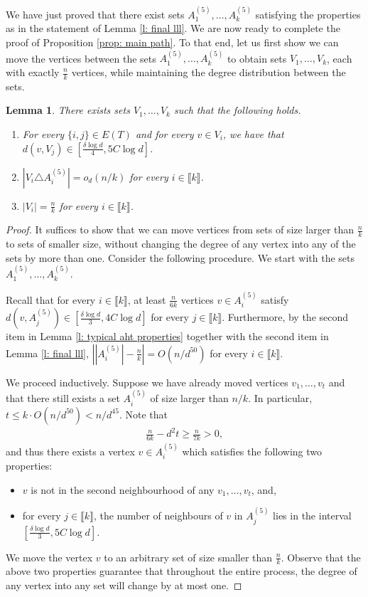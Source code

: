 \documentclass[notitlepage]{scrartcl}
\newcommand{\br}[1]{\llbracket{#1}\rrbracket}
\newtheorem{lemma}[thm]{Lemma}
\begin{document}
We have just proved that there exist sets $A_1^{(5)},\ldots, A_k^{(5)}$ satisfying the properties as in the statement of Lemma \ref{l: final lll}. We are now ready to complete the proof of Proposition \ref{prop: main path}. To that end, let us first show we can move the vertices between the sets $A_1^{(5)},\ldots, A_k^{(5)}$ to obtain sets $V_1,\ldots,V_k$, each with exactly $\frac{n}{k}$ vertices, while maintaining the degree distribution between the sets.
\begin{lemma}\label{l: final round}
There exists sets $V_1,\ldots,V_k$ such that the following holds.
\begin{enumerate}
    \item For every $\{i,j\}\in E(T)$ and for every $v\in V_i$, we have that $d(v,V_j)\in \left[\frac{\delta\log d}{4},5C\log d\right]$.
    \item $\left|V_i\triangle A_i^{(5)}\right|=o_d(n/k)$ for every $i\in \br{k}$.\label{l: final item distance}
    \item $|V_i|=\frac{n}{k}$ for every $i\in \br{k}$.
\end{enumerate}
\end{lemma}
\begin{proof}
It suffices to show that we can move vertices from sets of size larger than $\frac{n}{k}$ to sets of smaller size, without changing the degree of any vertex into any of the sets by more than one. Consider the following procedure. We start with the sets $A_1^{(5)},\ldots, A_k^{(5)}$. 

Recall that for every $i\in \br{k}$, at least $\frac{n}{6k}$ vertices $v\in A_i^{(5)}$ satisfy $d(v,A_j^{(5)})\in \left[\frac{\delta\log d}{3},4C\log d\right]$ for every $j\in \br{k}$. Furthermore, by the second item in Lemma \ref{l: typical aht properties} together with the second item in Lemma \ref{l: final lll}, $\left||A_i^{(5)}|-\frac{n}{k}\right|=O(n/d^{50})$ for every $i\in \br{k}$. 

We proceed inductively. Suppose we have already moved vertices $v_1,\ldots, v_t$ and that there still exists a set $A_i^{(5)}$ of size larger than $n/k$. In particular, $t\le k\cdot O(n/d^{50})<n/d^{45}$. Note that
\begin{align*}
    \frac{n}{6k}-d^2t\ge \frac{n}{7k}>0,
\end{align*}
and thus there exists a vertex $v\in A_i^{(5)}$ which satisfies the following two properties:
\begin{itemize}
    \item $v$ is not in the second neighbourhood of any $v_1,\ldots, v_t$, and,
    \item for every $j\in \br{k}$, the number of neighbours of $v$ in $A_j^{(5)}$ lies in the interval $\left[\frac{\delta\log d}{3},5C\log d\right]$.
\end{itemize}
We move the vertex $v$ to an arbitrary set of size smaller than $\frac{n}{k}$. Observe that the above two properties guarantee that throughout the entire process, the degree of any vertex into any set will change by at most one. 
\end{proof}
\end{document}
